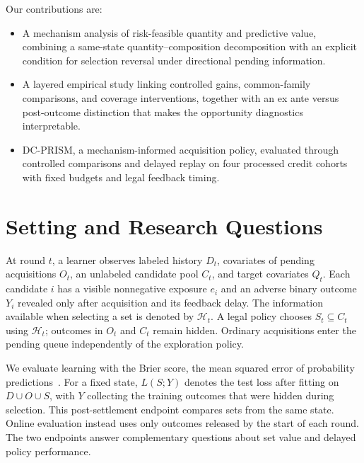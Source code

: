 \documentclass[runningheads]{llncs}
\begin{document}
Our contributions are:
\begin{itemize}
\item A mechanism analysis of risk-feasible quantity and predictive value, combining a same-state quantity--composition decomposition with an explicit condition for selection reversal under directional pending information.
\item A layered empirical study linking controlled gains, common-family comparisons, and coverage interventions, together with an ex ante versus post-outcome distinction that makes the opportunity diagnostics interpretable.
\item DC-PRISM, a mechanism-informed acquisition policy, evaluated through controlled comparisons and delayed replay on four processed credit cohorts with fixed budgets and legal feedback timing.
\end{itemize}


\section{Setting and Research Questions}
\label{sec:setting}

At round $t$, a learner observes labeled history $D_t$, covariates of pending acquisitions $O_t$, an unlabeled candidate pool $C_t$, and target covariates $Q_t$. Each candidate $i$ has a visible nonnegative exposure $e_i$ and an adverse binary outcome $Y_i$ revealed only after acquisition and its feedback delay. The information available when selecting a set is denoted by $\mathcal H_t$. A legal policy chooses $S_t\subseteq C_t$ using $\mathcal H_t$; outcomes in $O_t$ and $C_t$ remain hidden. Ordinary acquisitions enter the pending queue independently of the exploration policy. 

We evaluate learning with the Brier score, the mean squared error of probability predictions~\cite{brier1950verification}. For a fixed state, $L(S;Y)$ denotes the test loss after fitting on $D\cup O\cup S$, with $Y$ collecting the training outcomes that were hidden during selection. This post-settlement endpoint compares sets from the same state. Online evaluation instead uses only outcomes released by the start of each round. The two endpoints answer complementary questions about set value and delayed policy performance.
\end{document}
